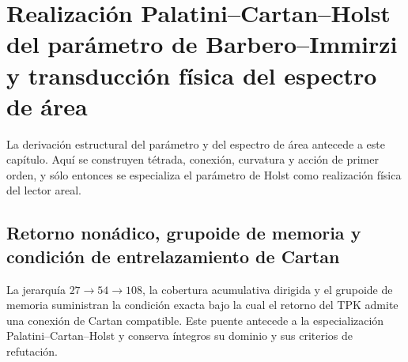 \chapter{Realización Palatini–Cartan–Holst del parámetro de Barbero–Immirzi y transducción física del espectro de área}
\label{chap:parte-iv-68}

La derivación estructural del parámetro y del espectro de área antecede a este capítulo. Aquí se construyen tétrada, conexión, curvatura y acción de primer orden, y sólo entonces se especializa el parámetro de Holst como realización física del lector areal.



\section{Retorno nonádico, grupoide de memoria y condición de entrelazamiento de Cartan}

La jerarquía \(27\to54\to108\), la cobertura acumulativa dirigida y el
grupoide de memoria suministran la condición exacta bajo la cual el retorno
del TPK admite una conexión de Cartan compatible. Este puente antecede a la
especialización Palatini--Cartan--Holst y conserva íntegros su dominio y sus
criterios de refutación.

\begingroup
\let\chapter\section
\let\section\subsection
\let\subsection\subsubsection
\let\subsubsection\paragraph
\let\clearpage\relax
\let\cleardoublepage\relax

\endgroup

